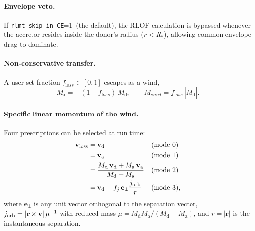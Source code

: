 \documentclass[11pt]{article}
\begin{document}
\paragraph{Envelope veto.} If \texttt{rlmt\_skip\_in\_CE}=1\ (the default), the RLOF calculation is bypassed whenever the accretor resides inside the donor’s radius ($r<R_*$), allowing common‑envelope drag to dominate.

\paragraph{Non‑conservative transfer.}
A user‑set fraction $f_{\mathrm loss}\in[0,1]$ escapes as a wind,
\begin{equation}
\dot M_{\mathrm a}=-(1-f_{\mathrm loss})\,\dot M_{\mathrm d},\qquad
\dot M_{\mathrm wind}=f_{\mathrm loss}\,|\dot M_{\mathrm d}|.
\label{eq:noncon}
\end{equation}

\paragraph{Specific linear momentum of the wind.}
Four prescriptions can be selected at run time:
\begin{subequations}\label{eq:joptions}
\begin{align}
\mathbf v_{\mathrm{loss}} &= \mathbf v_{\mathrm d} && (\text{mode }0)\\
                            &= \mathbf v_{\mathrm a} && (\text{mode }1)\\
                            &= \frac{M_{\mathrm d}\,\mathbf v_{\mathrm d}+M_{\mathrm a}\,\mathbf v_{\mathrm a}}
                               {M_{\mathrm d}+M_{\mathrm a}} && (\text{mode }2)\\
                            &= \mathbf v_{\mathrm d} + f_j\,\mathbf e_\perp
                               \frac{j_{\rm orb}}{r} && (\text{mode }3),
\end{align}
\end{subequations}
where $\mathbf e_\perp$ is any unit vector orthogonal to the separation
vector, $j_{\rm orb}=|\mathbf r\times\mathbf v|\,\mu^{-1}$ with reduced mass
$\mu=M_{\mathrm d}M_{\mathrm a}/(M_{\mathrm d}+M_{\mathrm a})$, and
$r=|\mathbf r|$ is the instantaneous separation.
\end{document}
